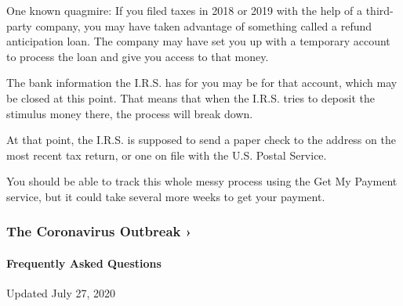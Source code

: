 One known quagmire: If you filed taxes in 2018 or 2019 with the help of
a third-party company, you may have taken advantage of something called
a refund anticipation loan. The company may have set you up with a
temporary account to process the loan and give you access to that money.

The bank information the I.R.S. has for you may be for that account,
which may be closed at this point. That means that when the I.R.S. tries
to deposit the stimulus money there, the process will break down.

At that point, the I.R.S. is supposed to send a paper check to the
address on the most recent tax return, or one on file with the U.S.
Postal Service.

You should be able to track this whole messy process using the Get My
Payment service, but it could take several more weeks to get your
payment.

\href{https://www.nytimes.com/news-event/coronavirus?action=click\&pgtype=Article\&state=default\&region=MAIN_CONTENT_3\&context=storylines_faq}{}

\hypertarget{the-coronavirus-outbreak-}{%
\subsubsection{The Coronavirus Outbreak
›}\label{the-coronavirus-outbreak-}}

\hypertarget{frequently-asked-questions}{%
\paragraph{Frequently Asked
Questions}\label{frequently-asked-questions}}

Updated July 27, 2020

